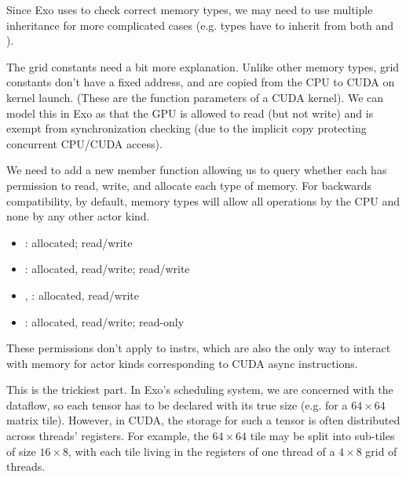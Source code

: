 \filbreak
Since Exo uses  to check correct memory types, we may need to use multiple inheritance for more complicated cases (e.g.  types have to inherit from both  and ).

\filbreak
The grid constants need a bit more explanation.
Unlike other memory types, grid constants don't have a fixed address, and are copied from the CPU to CUDA on kernel launch.
(These are the function parameters of a CUDA kernel).
We can model this in Exo as  that the GPU is allowed to read (but not write) and is exempt from synchronization checking (due to the implicit copy protecting concurrent CPU/CUDA access).

\filbreak
{} We need to add a new member function allowing us to query whether each  has permission to read, write, and allocate each type of memory.
For backwards compatibility, by default, memory types will allow all operations by the CPU and none by any other actor kind.

\filbreak
\begin{itemize}
  \item {}:  allocated;  read/write
  \item {}:  allocated, read/write;  read/write
  \item {}, :  allocated, read/write
  \item {}:  allocated, read/write;  read-only
\end{itemize}

\filbreak
These permissions don't apply to instrs, which are also the only way to interact with memory for actor kinds corresponding to CUDA async instructions.

\filbreak
{} This is the trickiest part.
In Exo's scheduling system, we are concerned with the dataflow, so each tensor has to be declared with its true size
(e.g.  for a $64 \times 64$ matrix tile).
However, in CUDA, the storage for such a tensor is often distributed across threads' registers.
For example, the $64 \times 64$ tile may be split into sub-tiles of size $16 \times 8$, with each tile living in the registers of one thread of a $4 \times 8$ grid of threads.


